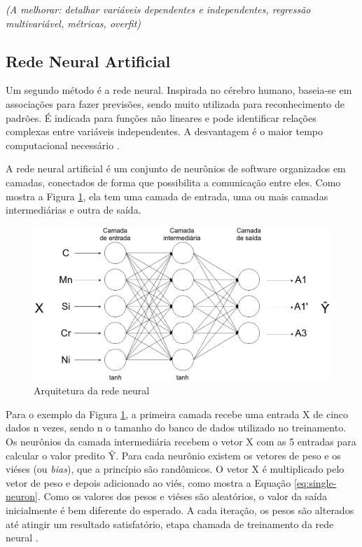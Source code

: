 \documentclass[brazil,tf,epusp]{usp}  %
\providecommand{\DIFaddend}{} %
\begin{document}
\DIFaddend \textit{(A melhorar: detalhar variáveis dependentes e independentes, regressão multivariável, métricas, overfit)}

\subsection{Rede Neural Artificial}
Um segundo método é a rede neural. Inspirada no cérebro humano, baseia-se em associações para fazer previsões, sendo muito utilizada para reconhecimento de padrões. É indicada para funções não lineares e pode identificar relações complexas entre variáveis independentes. A desvantagem é o maior tempo computacional necessário \cite{Belisle2015}.

A rede neural artificial é um conjunto de neurônios de software organizados em camadas, conectados de forma que possibilita a comunicação entre eles. Como mostra a Figura \ref{fig:rede-neural-arquitetura}, ela tem uma camada de entrada, uma ou mais camadas intermediárias e outra de saída.

\begin{figure}[ht!]
  \includegraphics[width=.9\textwidth]{img/neural-network.png}
  \caption{Arquitetura da rede neural}
  \label{fig:rede-neural-arquitetura}
\end{figure}

Para o exemplo da Figura \ref{fig:rede-neural-arquitetura}, a primeira camada recebe uma entrada X de cinco dados n vezes, sendo n o tamanho do banco de dados utilizado no treinamento. Os neurônios da camada intermediária recebem o vetor X com as 5 entradas para calcular o valor predito Ŷ. Para cada neurônio existem os vetores de peso e os viéses (ou \textit{bias}), que a princípio são randômicos. O vetor X é multiplicado pelo vetor de peso e depois adicionado ao viés, como mostra a Equação \ref{eq:single-neuron}. Como os valores dos pesos e viéses são aleatórios, o valor da saída inicialmente é bem diferente do esperado. A cada iteração, os pesos são alterados até atingir um resultado satisfatório, etapa chamada de treinamento da rede neural \cite{Bhadeshia1999}.
\end{document}
